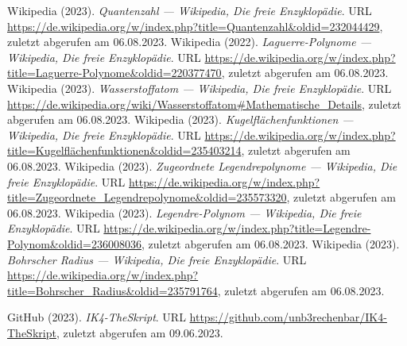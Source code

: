 \documentclass[../main.tex]{subfiles}
\begin{document}
\begin{thebibliography}{99}



		 Wikipedia (2023). \emph{Quantenzahl --- Wikipedia{,} Die freie Enzyklopädie}. URL \url{https://de.wikipedia.org/w/index.php?title=Quantenzahl&oldid=232044429}, zuletzt abgerufen am 06.08.2023. 
		 Wikipedia (2022). \emph{Laguerre-Polynome --- Wikipedia{,} Die freie Enzyklopädie}. URL \url{https://de.wikipedia.org/w/index.php?title=Laguerre-Polynome&oldid=220377470}, zuletzt abgerufen am 06.08.2023. 
		 Wikipedia (2023). \emph{Wasserstoffatom --- Wikipedia{,} Die freie Enzyklopädie}. URL \url{https://de.wikipedia.org/wiki/Wasserstoffatom#Mathematische_Details}, zuletzt abgerufen am 06.08.2023.
		 Wikipedia (2023). \emph{Kugelflächenfunktionen --- Wikipedia{,} Die freie Enzyklopädie}. URL \url{https://de.wikipedia.org/w/index.php?title=Kugelflächenfunktionen&oldid=235403214}, zuletzt abgerufen am 06.08.2023.
		 Wikipedia (2023). \emph{Zugeordnete Legendrepolynome --- Wikipedia{,} Die freie Enzyklopädie}. URL \url{https://de.wikipedia.org/w/index.php?title=Zugeordnete_Legendrepolynome&oldid=235573320}, zuletzt abgerufen am 06.08.2023.
		 Wikipedia (2023). \emph{Legendre-Polynom --- Wikipedia{,} Die freie Enzyklopädie}. URL \url{https://de.wikipedia.org/w/index.php?title=Legendre-Polynom&oldid=236008036}, zuletzt abgerufen am 06.08.2023.
		 Wikipedia (2023). \emph{Bohrscher Radius --- Wikipedia{,} Die freie Enzyklopädie}. URL \url{https://de.wikipedia.org/w/index.php?title=Bohrscher_Radius&oldid=235791764}, zuletzt abgerufen am 06.08.2023.

		 GitHub (2023). \emph{IK4-TheSkript}. URL \url{https://github.com/unb3rechenbar/IK4-TheSkript}, zuletzt abgerufen am 09.06.2023.
	

	\end{thebibliography}
\end{document}
